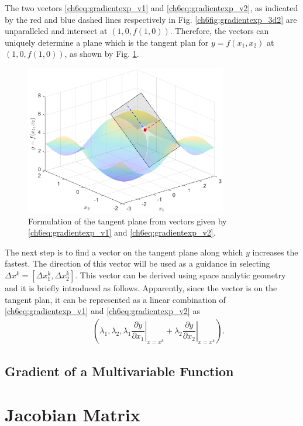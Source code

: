 The two vectors \eqref{ch6eq:gradientexp_v1} and \eqref{ch6eq:gradientexp_v2}, as indicated by the red and blue dashed lines respectively in Fig. \ref{ch6fig:gradientexp_3d2} are unparalleled and intersect at $\left(1,0,f(1,0)\right)$. Therefore, the vectors can uniquely determine a plane which is the tangent plan for $y=f(x_1,x_2)$ at $\left(1,0,f(1,0)\right)$, as shown by Fig. \ref{ch6fig:gradientexp_3d3}.

\begin{figure}
	\centering
	\includegraphics[width=250pt]{chapters/chapter6/figures/gradientexp_3d3.eps}
	\caption{Formulation of the tangent plane from vectors given by \eqref{ch6eq:gradientexp_v1} and \eqref{ch6eq:gradientexp_v2}.} \label{ch6fig:gradientexp_3d3}
\end{figure}

The next step is to find a vector on the tangent plane along which $y$ increases the fastest. The direction of this vector will be used as a guidance in selecting $\Delta x^k = [\Delta x_1^k, \Delta x_2^k]$. This vector can be derived using space analytic geometry and it is briefly introduced as follows. Apparently, since the vector is on the tangent plan, it can be represented as a linear combination of \eqref{ch6eq:gradientexp_v1} and \eqref{ch6eq:gradientexp_v2} as
\begin{eqnarray}
    && \left(\lambda_1, \lambda_2, \lambda_1\left.\dfrac{\partial y}{\partial x_1}\right|_{x=x^k} + \lambda_2\left.\dfrac{\partial y}{\partial x_2}\right|_{x=x^k} \right) . \nonumber
\end{eqnarray}
















\subsection{Gradient of a Multivariable Function} \label{ch6subsec:gradientdef}




\section{Jacobian Matrix} \label{ch6sec:jacobianmatrix}
